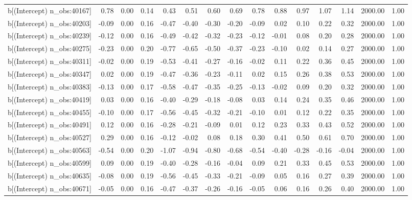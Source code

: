 \begin{table}[ht]
\begin{tabular}{rrrrrrrrrrrrrrr}
  b[(Intercept) n\_obs:40167] & 0.78 & 0.00 & 0.14 & 0.43 & 0.51 & 0.60 & 0.69 & 0.78 & 0.88 & 0.97 & 1.07 & 1.14 & 2000.00 & 1.00 \\ 
  b[(Intercept) n\_obs:40203] & -0.09 & 0.00 & 0.16 & -0.47 & -0.40 & -0.30 & -0.20 & -0.09 & 0.02 & 0.10 & 0.22 & 0.32 & 2000.00 & 1.00 \\ 
  b[(Intercept) n\_obs:40239] & -0.12 & 0.00 & 0.16 & -0.49 & -0.42 & -0.32 & -0.23 & -0.12 & -0.01 & 0.08 & 0.20 & 0.28 & 2000.00 & 1.00 \\ 
  b[(Intercept) n\_obs:40275] & -0.23 & 0.00 & 0.20 & -0.77 & -0.65 & -0.50 & -0.37 & -0.23 & -0.10 & 0.02 & 0.14 & 0.27 & 2000.00 & 1.00 \\ 
  b[(Intercept) n\_obs:40311] & -0.02 & 0.00 & 0.19 & -0.53 & -0.41 & -0.27 & -0.16 & -0.02 & 0.11 & 0.22 & 0.36 & 0.45 & 2000.00 & 1.00 \\ 
  b[(Intercept) n\_obs:40347] & 0.02 & 0.00 & 0.19 & -0.47 & -0.36 & -0.23 & -0.11 & 0.02 & 0.15 & 0.26 & 0.38 & 0.53 & 2000.00 & 1.00 \\ 
  b[(Intercept) n\_obs:40383] & -0.13 & 0.00 & 0.17 & -0.58 & -0.47 & -0.35 & -0.25 & -0.13 & -0.02 & 0.09 & 0.20 & 0.32 & 2000.00 & 1.00 \\ 
  b[(Intercept) n\_obs:40419] & 0.03 & 0.00 & 0.16 & -0.40 & -0.29 & -0.18 & -0.08 & 0.03 & 0.14 & 0.24 & 0.35 & 0.46 & 2000.00 & 1.00 \\ 
  b[(Intercept) n\_obs:40455] & -0.10 & 0.00 & 0.17 & -0.56 & -0.45 & -0.32 & -0.21 & -0.10 & 0.01 & 0.12 & 0.22 & 0.35 & 2000.00 & 1.00 \\ 
  b[(Intercept) n\_obs:40491] & 0.12 & 0.00 & 0.16 & -0.28 & -0.21 & -0.09 & 0.01 & 0.12 & 0.23 & 0.33 & 0.43 & 0.52 & 2000.00 & 1.00 \\ 
  b[(Intercept) n\_obs:40527] & 0.29 & 0.00 & 0.16 & -0.12 & -0.02 & 0.08 & 0.18 & 0.30 & 0.41 & 0.50 & 0.61 & 0.70 & 2000.00 & 1.00 \\ 
  b[(Intercept) n\_obs:40563] & -0.54 & 0.00 & 0.20 & -1.07 & -0.94 & -0.80 & -0.68 & -0.54 & -0.40 & -0.28 & -0.16 & -0.04 & 2000.00 & 1.00 \\ 
  b[(Intercept) n\_obs:40599] & 0.09 & 0.00 & 0.19 & -0.40 & -0.28 & -0.16 & -0.04 & 0.09 & 0.21 & 0.33 & 0.45 & 0.53 & 2000.00 & 1.00 \\ 
  b[(Intercept) n\_obs:40635] & -0.08 & 0.00 & 0.19 & -0.56 & -0.45 & -0.33 & -0.21 & -0.09 & 0.05 & 0.16 & 0.27 & 0.39 & 2000.00 & 1.00 \\ 
  b[(Intercept) n\_obs:40671] & -0.05 & 0.00 & 0.16 & -0.47 & -0.37 & -0.26 & -0.16 & -0.05 & 0.06 & 0.16 & 0.26 & 0.40 & 2000.00 & 1.00 \\ 

\end{tabular}
\end{table}
